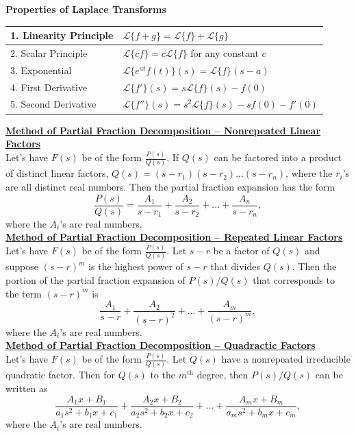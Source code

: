 \textbf{Properties of Laplace Transforms} \\
\begin{center}
{\renewcommand{\arraystretch}{2.5}
\begin{tabular}{|l|l|} \hline
1. Linearity Principle & $\mathscr{L}\{f+g\}=\mathscr{L}\{f\}+\mathscr{L}\{g\}$ \\ \hline
2. Scalar Principle & $\mathscr{L}\{cf\}=c\mathscr{L}\{f\}$ for any constant $c$ \\ \hline
3. Exponential & $\mathscr{L}\{e^{at}f(t)\}(s)=\mathscr{L}\{f\}(s-a)$ \\ \hline
4. First Derivative & $\mathscr{L}\{f'\}(s)=s\mathscr{L}\{f\}(s)-f(0)$ \\ \hline
5. Second Derivative & $\mathscr{L}\{f''\}(s)=s^2\mathscr{L}\{f\}(s)-sf(0)-f'(0)$ \\ \hline
\end{tabular}
}
\end{center}

\newpage
{}
\textbf{\underline{Method of Partial Fraction Decomposition -- Nonrepeated Linear Factors}} \\

Let's have $F(s)$ be of the form $\displaystyle\frac{P(s)}{Q(s)}$. If $Q(s)$ can be factored into a product of distinct linear factors, $Q(s)=(s-r_1)(s-r_2)...(s-r_n)$, where the $r_i$'s are all distinct real numbers. Then the partial fraction expansion has the form
\[
\frac{P(s)}{Q(s)}=\frac{A_1}{s-r_1}+\frac{A_2}{s-r_2}+...+\frac{A_n}{s-r_n},
\]
where the $A_i$'s are real numbers. \\

\textbf{\underline{Method of Partial Fraction Decomposition -- Repeated Linear Factors}} \\

Let's have $F(s)$ be of the form $\displaystyle\frac{P(s)}{Q(s)}$. Let $s-r$ be a factor of $Q(s)$ and suppose $(s-r)^m$ is the highest power of $s-r$ that divides $Q(s)$. Then the portion of the partial fraction expansion of $P(s)/Q(s)$ that corresponds to the term $(s-r)^m$ is
\[
\frac{A_1}{s-r}+\frac{A_2}{(s-r)^2}+...+\frac{A_m}{(s-r)^m},
\]
where the $A_i$'s are real numbers. \\

\textbf{\underline{Method of Partial Fraction Decomposition -- Quadractic Factors}} \\

Let's have $F(s)$ be of the form $\displaystyle\frac{P(s)}{Q(s)}$. Let $Q(s)$ have a nonrepeated irreducible quadratic factor. Then for $Q(s)$ to the $m^{\text{th}}$ degree, then $P(s)/Q(s)$ can be written as
\[
\frac{A_1x+B_1}{a_1s^2+b_1x+c_1}+\frac{A_2x+B_2}{a_2s^2+b_2x+c_2}+...+\frac{A_mx+B_m}{a_ms^2+b_mx+c_m},
\]
where the $A_i$'s are real numbers.

